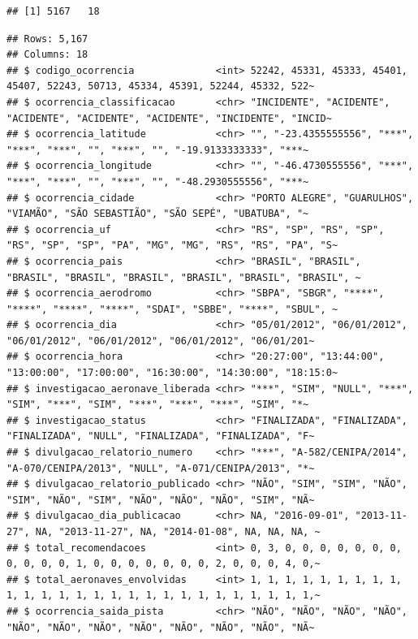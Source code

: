 \documentclass[
]{article}
\newenvironment{Shaded}{\begin{snugshade}}{\end{snugshade}}
\newcommand{\FloatTok}[1]{\textcolor[rgb]{0.00,0.00,0.81}{#1}}
\newcommand{\FunctionTok}[1]{\textcolor[rgb]{0.00,0.00,0.00}{#1}}
\newcommand{\NormalTok}[1]{#1}
\newcommand{\SpecialCharTok}[1]{\textcolor[rgb]{0.00,0.00,0.00}{#1}}
\begin{document}
\begin{verbatim}
## [1] 5167   18
\end{verbatim}

\begin{Shaded}
\end{Shaded}

\begin{verbatim}
## Rows: 5,167
## Columns: 18
## $ codigo_ocorrencia              <int> 52242, 45331, 45333, 45401, 45407, 52243, 50713, 45334, 45391, 52244, 45332, 522~
## $ ocorrencia_classificacao       <chr> "INCIDENTE", "ACIDENTE", "ACIDENTE", "ACIDENTE", "ACIDENTE", "INCIDENTE", "INCID~
## $ ocorrencia_latitude            <chr> "", "-23.4355555556", "***", "***", "***", "", "***", "", "-19.9133333333", "***~
## $ ocorrencia_longitude           <chr> "", "-46.4730555556", "***", "***", "***", "", "***", "", "-48.2930555556", "***~
## $ ocorrencia_cidade              <chr> "PORTO ALEGRE", "GUARULHOS", "VIAMÃO", "SÃO SEBASTIÃO", "SÃO SEPÉ", "UBATUBA", "~
## $ ocorrencia_uf                  <chr> "RS", "SP", "RS", "SP", "RS", "SP", "SP", "PA", "MG", "MG", "RS", "RS", "PA", "S~
## $ ocorrencia_pais                <chr> "BRASIL", "BRASIL", "BRASIL", "BRASIL", "BRASIL", "BRASIL", "BRASIL", "BRASIL", ~
## $ ocorrencia_aerodromo           <chr> "SBPA", "SBGR", "****", "****", "****", "****", "SDAI", "SBBE", "****", "SBUL", ~
## $ ocorrencia_dia                 <chr> "05/01/2012", "06/01/2012", "06/01/2012", "06/01/2012", "06/01/2012", "06/01/201~
## $ ocorrencia_hora                <chr> "20:27:00", "13:44:00", "13:00:00", "17:00:00", "16:30:00", "14:30:00", "18:15:0~
## $ investigacao_aeronave_liberada <chr> "***", "SIM", "NULL", "***", "SIM", "***", "SIM", "***", "***", "***", "SIM", "*~
## $ investigacao_status            <chr> "FINALIZADA", "FINALIZADA", "FINALIZADA", "NULL", "FINALIZADA", "FINALIZADA", "F~
## $ divulgacao_relatorio_numero    <chr> "***", "A-582/CENIPA/2014", "A-070/CENIPA/2013", "NULL", "A-071/CENIPA/2013", "*~
## $ divulgacao_relatorio_publicado <chr> "NÃO", "SIM", "SIM", "NÃO", "SIM", "NÃO", "SIM", "NÃO", "NÃO", "NÃO", "SIM", "NÃ~
## $ divulgacao_dia_publicacao      <chr> NA, "2016-09-01", "2013-11-27", NA, "2013-11-27", NA, "2014-01-08", NA, NA, NA, ~
## $ total_recomendacoes            <int> 0, 3, 0, 0, 0, 0, 0, 0, 0, 0, 0, 0, 0, 1, 0, 0, 0, 0, 0, 0, 0, 2, 0, 0, 0, 4, 0,~
## $ total_aeronaves_envolvidas     <int> 1, 1, 1, 1, 1, 1, 1, 1, 1, 1, 1, 1, 1, 1, 1, 1, 1, 1, 1, 1, 1, 1, 1, 1, 1, 1, 1,~
## $ ocorrencia_saida_pista         <chr> "NÃO", "NÃO", "NÃO", "NÃO", "NÃO", "NÃO", "NÃO", "NÃO", "NÃO", "NÃO", "NÃO", "NÃ~
\end{verbatim}
\end{document}
